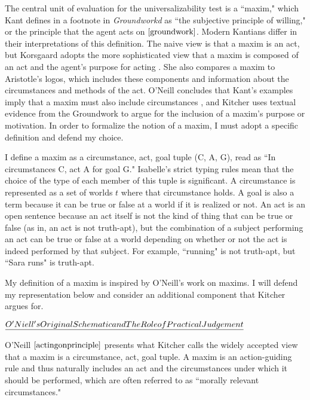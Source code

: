 \begin{isabellebody}
\begin{isamarkuptext}%
The central unit of evaluation for the universalizability test is a ``maxim," which Kant defines 
in a footnote in \emph{Groundworkd} as ``the subjective principle of willing," or the principle that 
the agent acts on $\cite[16]{groundwork}$. Modern Kantians differ in their interpretations of this definition. The naive view 
is that a maxim is an act, but Korsgaard adopts the more sophisticated view that a maxim is composed
of an act and the agent's purpose for acting \cite{actingforareason}. She also compares a maxim 
to Aristotle's logos, which includes these components and information about the circumstances and methods 
of the act. O'Neill concludes that Kant's examples imply that a maxim must also include circumstances \cite{actingonprinciple}, and 
Kitcher \cite{whatisamaxim} uses textual evidence from the Groundwork to argue for the inclusion of a maxim's purpose 
or motivation. In order to formalize the notion of a maxim, I must adopt a specific definition and 
defend my choice.

I define a maxim as a circumstance, act, goal tuple (C, A, G), read 
as ``In circumstances C, act A for goal G." Isabelle's strict typing rules mean that the choice of the 
type of each member of this tuple is significant. A circumstance is represented as a set of worlds 
$t$ where that circumstance holds. A goal is also a term because it can be true or false at a world if it 
is realized or not. An act is an open sentence because an act itself is not the kind of thing that can 
be true or false (as in, an act is not truth-apt), but the combination of a subject performing an act 
can be true or false at a world depending on whether or not the act is indeed performed by that subject. 
For example, ``running" is not truth-apt, but ``Sara runs" is truth-apt.

My definition of a maxim is inspired by O'Neill's work on maxims. I will defend my representation
below and consider an additional component that Kitcher argues for.

$\emph{O'Niell's Original Schematic and The Role of Practical Judgement}$

O'Neill $\cite[37]{actingonprinciple}$ presents what Kitcher \cite{whatisamaxim}  calls the widely accepted 
view that a maxim is a circumstance, act, goal tuple. A maxim 
is an action-guiding rule and thus naturally includes an act and the circumstances under which 
it should be performed, which are often referred to as ``morally relevant circumstances." 


\end{isamarkuptext}
\end{isabellebody}
